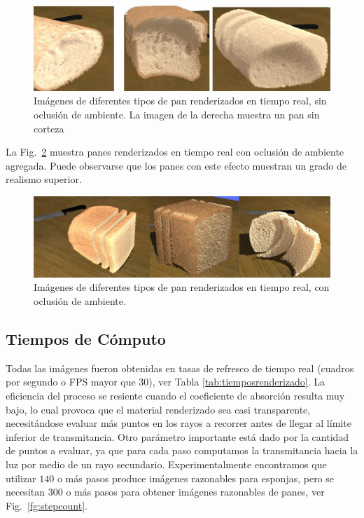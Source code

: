 \begin{figure}[htb!]
  \centerline{\includegraphics[width=13cm]{figures/fig5}}
  \caption[Imágenes de diferentes tipos de pan renderizados en tiempo real, sin oclusión de ambiente]{Imágenes de diferentes tipos de pan renderizados en tiempo real, sin oclusión de ambiente. La imagen de la derecha muestra un pan sin corteza}
  \label{fg:breadsnooc}
\end{figure}

La Fig.~\ref{fg:breads} muestra panes renderizados en tiempo real con oclusión de ambiente agregada.
Puede observarse que los panes con este efecto muestran un grado de realismo superior.

\begin{figure}[htb!]
  \centerline{\includegraphics[width=13cm]{figures/breads}}
  \caption{Imágenes de diferentes tipos de pan renderizados en tiempo real, con oclusión de ambiente.}
  \label{fg:breads}
\end{figure}



\subsection*{Tiempos de Cómputo}

Todas las imágenes fueron obtenidas en tasas de refresco de tiempo real (cuadros por segundo o \acrshort{FPS} mayor que $30$), ver Tabla \ref{tab:tiemposrenderizado}.
La eficiencia del proceso se resiente cuando el coeficiente de absorción resulta muy bajo, lo cual provoca que el material renderizado sea casi transparente, necesitándose evaluar más puntos en los rayos a recorrer antes de llegar al límite inferior de transmitancia.
Otro parámetro importante está dado por la cantidad de puntos a evaluar, ya que para cada paso computamos la transmitancia hacia la luz por medio de un rayo secundario.
Experimentalmente encontramos que utilizar $140$ o más pasos produce imágenes razonables para esponjas, pero se necesitan $300$ o más pasos para obtener imágenes razonables de panes, ver Fig.~\ref{fg:stepcount}.



